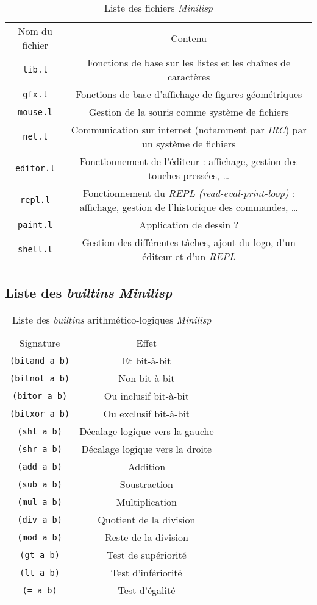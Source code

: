 \documentclass[a4paper, 10pt, french]{article}
\newcommand{\codeLisp}[1]{\texttt{#1}}
\newcommand{\code}[1]{\texttt{#1}}
\newcommand{\foreign}[1]{\emph{#1}}
\begin{document}
\begin{table}[H]
  \centering
  \begin{tabularx}{\linewidth}{|C|C|}
    \hline
    Nom du fichier & Contenu \tabularnewline
    \hhline{|=|=|}
    \code{lib.l} & Fonctions de base sur les listes et les chaînes de caractères \tabularnewline
    \hline
    \code{gfx.l} & Fonctions de base d'affichage de figures géométriques \tabularnewline
    \hhline{|=|=|}
    \code{mouse.l} & Gestion de la souris comme système de fichiers \tabularnewline
    \hline
    \code{net.l} & Communication sur internet (notamment par \foreign{IRC}) par un système de fichiers \tabularnewline
    \hhline{|=|=|}
    \code{editor.l} & Fonctionnement de l'éditeur : affichage, gestion des touches pressées, \ldots \tabularnewline
    \hline
    \code{repl.l} & Fonctionnement du \foreign{REPL (read-eval-print-loop)} : affichage, gestion de l'historique des commandes, \ldots \tabularnewline
    \hline
    \code{paint.l} & Application de dessin ? \tabularnewline
    \hhline{|=|=|}
    \code{shell.l} & Gestion des différentes tâches, ajout du logo, d'un éditeur et d'un \foreign{REPL} \tabularnewline
    \hline
  \end{tabularx}
  \caption{Liste des fichiers \foreign{Minilisp}}
\end{table}

\subsection{Liste des \foreign{builtins} \foreign{Minilisp}}

\begin{table}[H]
  \centering
  \begin{tabularx}{\linewidth}{|C|C|}
    \hline
    Signature & Effet \tabularnewline
    \hhline{|=|=|}
    \codeLisp{(bitand a b)} & Et bit-à-bit \tabularnewline
    \hline
    \codeLisp{(bitnot a b)} & Non bit-à-bit \tabularnewline
    \hline
    \codeLisp{(bitor a b)} & Ou inclusif bit-à-bit \tabularnewline
    \hline
    \codeLisp{(bitxor a b)} & Ou exclusif bit-à-bit \tabularnewline
    \hhline{|=|=|}
    \codeLisp{(shl a b)} & Décalage logique vers la gauche \tabularnewline
    \hline
    \codeLisp{(shr a b)} & Décalage logique vers la droite \tabularnewline
    \hhline{|=|=|}
    \codeLisp{(add a b)} & Addition \tabularnewline
    \hline
    \codeLisp{(sub a b)} & Soustraction \tabularnewline
    \hline
    \codeLisp{(mul a b)} & Multiplication \tabularnewline
    \hline
    \codeLisp{(div a b)} & Quotient de la division \tabularnewline
    \hline
    \codeLisp{(mod a b)} & Reste de la division \tabularnewline
    \hhline{|=|=|}
    \codeLisp{(gt a b)} & Test de supériorité \tabularnewline
    \hline
    \codeLisp{(lt a b)} & Test d'infériorité \tabularnewline
    \hline
    \codeLisp{(= a b)} & Test d'égalité \tabularnewline
    \hline
  \end{tabularx}
  \caption{Liste des \foreign{builtins} arithmético-logiques \foreign{Minilisp}}
\end{table}
\end{document}
